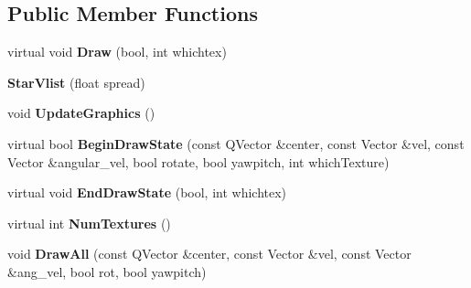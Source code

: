 \subsection*{Public Member Functions}
\begin{DoxyCompactItemize}
\item 
virtual void {\bfseries Draw} (bool, int whichtex)\hypertarget{classStarVlist_ac79d1ab86a062ea55a9c9aa9752522b9}{}\label{classStarVlist_ac79d1ab86a062ea55a9c9aa9752522b9}

\item 
{\bfseries Star\+Vlist} (float spread)\hypertarget{classStarVlist_ac9b5c2f0441c696d1104eae94b74113f}{}\label{classStarVlist_ac9b5c2f0441c696d1104eae94b74113f}

\item 
void {\bfseries Update\+Graphics} ()\hypertarget{classStarVlist_a6b7cd4c2765d731635268decc1254c53}{}\label{classStarVlist_a6b7cd4c2765d731635268decc1254c53}

\item 
virtual bool {\bfseries Begin\+Draw\+State} (const Q\+Vector \&center, const Vector \&vel, const Vector \&angular\+\_\+vel, bool rotate, bool yawpitch, int which\+Texture)\hypertarget{classStarVlist_a4ce79ee660bd9864b4ccfed9a5002258}{}\label{classStarVlist_a4ce79ee660bd9864b4ccfed9a5002258}

\item 
virtual void {\bfseries End\+Draw\+State} (bool, int whichtex)\hypertarget{classStarVlist_af531f59944a2d5fbcc2c7f7ba265fd52}{}\label{classStarVlist_af531f59944a2d5fbcc2c7f7ba265fd52}

\item 
virtual int {\bfseries Num\+Textures} ()\hypertarget{classStarVlist_ab8624a88bd736eb869a7b413a08f5dfa}{}\label{classStarVlist_ab8624a88bd736eb869a7b413a08f5dfa}

\item 
void {\bfseries Draw\+All} (const Q\+Vector \&center, const Vector \&vel, const Vector \&ang\+\_\+vel, bool rot, bool yawpitch)\hypertarget{classStarVlist_af9626b44a8ac0e705287a49133cc13a0}{}\label{classStarVlist_af9626b44a8ac0e705287a49133cc13a0}

\end{DoxyCompactItemize}
